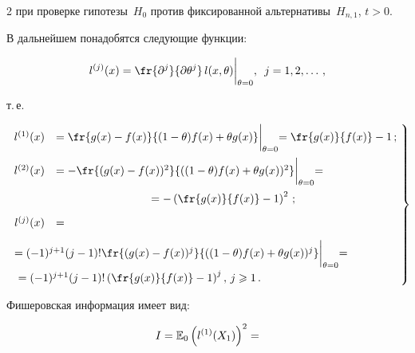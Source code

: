 \begin{multicols}{2}
при проверке гипотезы~$H_0$ против фиксированной альтернативы~$H_{n,1}$, $t>0$.



В дальнейшем понадобятся следующие функции:

$$

l^{(j)}(x)=\fr{\partial^{j}}{\partial\theta^{j}}\,l(x,\theta)\biggl|_{\theta=0},

\enskip j=1,2,\ldots\,,

$$

т.\,е.\

\begin{equation}

\left.

\begin{array}{rl}

\!\!\!l^{(1)}(x)&=\fr{g(x)-f(x)}{(1-\theta)f(x)+\theta g(x)}\biggl|_{\theta=0}=

\fr{g(x)}{f(x)}-1\,;\\[12pt]

\!\!\!l^{(2)}(x)&=-\fr{(g(x)-f(x))^2}{((1-\theta)f(x)+\theta

g(x))^2}\biggl|_{\theta=0}={}\\[12pt]

&\hspace*{30mm}=-\left(\fr{g(x)}{f(x)}-1\right)^2\,;\\[9pt]

l^{(j)}(x)&={}\\[9pt]

&\!\!\!\!\!\!\!\!\!\!\!\!\!\!\!\!\!\!\!\!\!\!\!\!{}=(-1)^{j+1}(j-1)!\fr{(g(x)-f(x))^j}{((1-\theta)f(x)+\theta

g(x))^j}\biggl|_{\theta=0}={}\\[9pt]

&\!\!\!\!\!\!\!\!\!\!\!\!\!\!\!\!\!\!\!\!\!\!{}=(-1)^{j+1}(j-1)!\left(\fr{g(x)}{f(x)}-1\right)^j,\,j\geqslant1\,.

\end{array}\!

\right\}\!\!

\label{lj(x)}

\end{equation}



Фишеровская информация имеет вид:

\begin{multline}

\label{I}

I=\E_0\left(l^{(1)}(X_1)\right)^2=


\end{multline}
\end{multicols}
